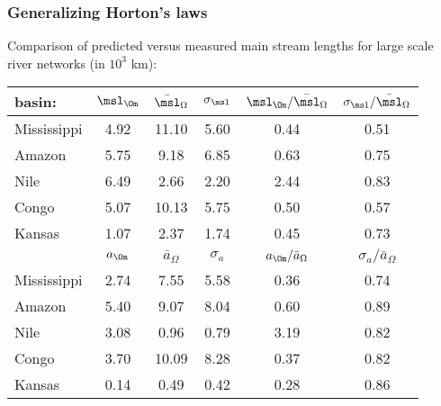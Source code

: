 \begin{frame}[label=]
  \frametitle{Generalizing Horton's laws}

  Comparison of predicted versus measured main stream lengths
  for large scale river networks (in $10^3$ km):
  \begin{center}
    \settablerowcolours
    \begin{tabular}{lccccc}
      \hline
      basin: &  $\msl_\Om$ & $\bar{\msl}_\Omega$ & 
      $\sigma_\msl$ & $\msl_\Om/\bar{\msl}_\Omega$ & $\sigma_\msl/\bar{\msl}_\Omega$ \\ \hline
      Mississippi & 4.92 & 11.10 & 5.60 & 0.44 & 0.51 \\
      Amazon &  5.75 & 9.18 & 6.85 & 0.63 & 0.75 \\
      Nile & 6.49 & 2.66 & 2.20 & 2.44 & 0.83 \\
      Congo & 5.07 & 10.13 & 5.75 & 0.50 & 0.57 \\ 
      Kansas & 1.07 & 2.37 & 1.74 & 0.45 & 0.73 \\ \hline\hline
      & $a_\Om$ & $\bar{a}_\Omega$ & $\sigma_a$ & $a_\Om/\bar{a}_\Omega$ & $\sigma_a/\bar{a}_\Omega$ \\ \hline
      Mississippi & 2.74 & 7.55 & 5.58 & 0.36 & 0.74 \\
      Amazon & 5.40 & 9.07 & 8.04 & 0.60 & 0.89 \\
      Nile & 3.08 & 0.96 & 0.79 & 3.19 & 0.82 \\
      Congo & 3.70 & 10.09 & 8.28 & 0.37 & 0.82 \\
      Kansas & 0.14 & 0.49 & 0.42 & 0.28 & 0.86 \\
    \end{tabular}
  \end{center}

\end{frame}



